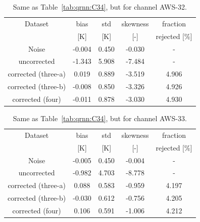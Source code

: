\documentclass[12pt]{article}
\begin{document}
\begin{table}[!p]
	\centering
	\begin{tabular}[b]{c|c|c|c|c}
	Dataset  		  &   bias &   std &   skewness & fraction  \\
	&   [K]  &   [K] & [-] & rejected [\%]\\
		\hline
Noise                       & -0.004 & 0.450 &             -0.030 &      - \\
uncorrected                 & -1.343 & 5.908 &             -7.484 &      - \\
corrected (three-a)  		&  0.019 & 0.889 &             -3.519 &      4.906 \\	 
corrected (three-b)  		& -0.008 & 0.850 &             -3.326 &      4.926 \\			
corrected (four)    		& -0.011 & 0.878 &             -3.030 &      4.930 \\
		\hline
	\end{tabular}
	\caption{ Same as Table~\ref{tab:qrnn:C34}, but for channel AWS-32.}
	\label{tab:qrnn:C32}
\end{table}


\begin{table}[!p]
	\centering
	\begin{tabular}[b]{c|c|c|c|c}
	Dataset  		  &   bias &   std &   skewness & fraction  \\
	&   [K]  &   [K] & [-] & rejected [\%]\\
		\hline
Noise                       & -0.005 & 0.450 &             -0.004 &      - \\
uncorrected                 & -0.982 & 4.703 &             -8.778 &      - \\
corrected (three-a) 		&  0.088 & 0.583 &             -0.959 &      4.197 \\
corrected (three-b)  		& -0.030 & 0.612 &             -0.756 &      4.205 \\
corrected (four)            &  0.106 & 0.591 &             -1.006 &      4.212 \\
		\hline
		
	\end{tabular}
	\caption{ Same as Table~\ref{tab:qrnn:C34}, but for channel AWS-33.}
	\label{tab:qrnn:C33}
\end{table}
\end{document}
